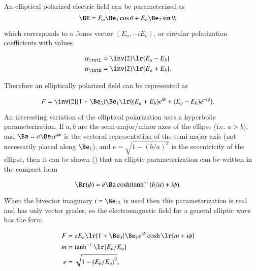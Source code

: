 
An elliptical polarized electric field can be parameterized as
\begin{dmath}\label{eqn:polarization_elliptical:340}
\BE
=
E_a \Be_1 \cos\theta + E_b \Be_2 \sin\theta,
\end{dmath}

which corresponds to a Jones vector \( (E_a, -i E_b) \), or circular polarization coefficients with values

\begin{dmath}\label{eqn:polarization_elliptical:400}
\begin{aligned}
\alpha_\txtL &= \inv{2}\lr{ E_a - E_b } \\
\alpha_\txtR &= \inv{2}\lr{ E_a + E_b }.
\end{aligned}
\end{dmath}

Therefore an elliptically polarized field can be represented as

\begin{dmath}\label{eqn:polarization_elliptical:420}
F = \inv{2} (1 + \Be_3) \Be_1 \lr{ (E_a + E_b) e^{i\phi} + (E_a - E_b) e^{-i\phi} }.
\end{dmath}

An interesting variation of the elliptical polarization uses a hyperbolic parameterization.
If \( a, b \) are the semi-major/minor axes of the ellipse (i.e. \( a > b \)),
and \( \Ba = a \Be_1 e^{i\psi} \) is the vectoral representation of the semi-major axis (not necessarily placed along \( \Be_1 \)),
and \( e = \sqrt{1 - (b/a)^2} \) is the eccentricity of the ellipse,
then it can be shown (\citep{hestenes1999nfc})
that an elliptic parameterization can be written
in the compact form

\begin{dmath}\label{eqn:polarization_elliptical:360}
\Br(\phi)
=
e \Ba \cosh( \tanh^{-1}(b/a) + i \phi).
\end{dmath}

When the bivector imaginary \( i = \Be_{12} \) is used then
this parameterization is real and has only vector grades, so the electromagnetic field for a general elliptic wave has the form

\begin{dmath}\label{eqn:polarization_elliptical:380}
\begin{aligned}
F &= e E_a \lr{ 1 + \Be_3 } \Be_1 e^{ i \psi } \cosh\lr{ m + i \phi} \\
m &= \tanh^{-1}\lr{ E_b/E_a } \\
e &= \sqrt{1 - {(E_b/E_a)}^2 },
\end{aligned}
\end{dmath}

